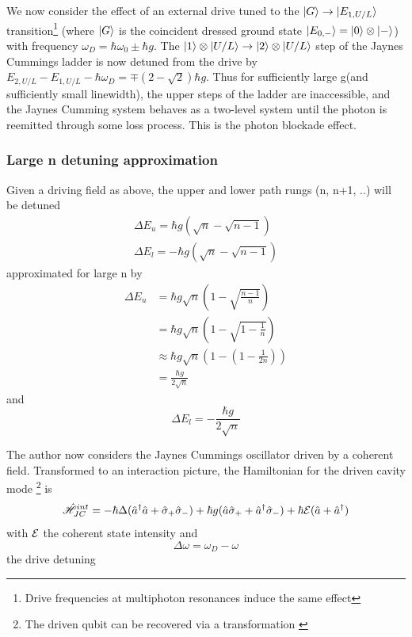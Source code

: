 We now consider the effect of an external drive tuned to the $| G \rangle \rightarrow | E_{1, U/L} \rangle$ transition\footnote{Drive frequencies at multiphoton resonances induce the same effect} (where $| G \rangle$ is the coincident dressed ground state $| E_{0, -} \rangle = | 0 \rangle \otimes | - \rangle$) with frequency $\omega_D = \hbar \omega_0 \pm \hbar g$.
The $| 1 \rangle \otimes | U/L \rangle \rightarrow | 2 \rangle \otimes | U/L \rangle$ step of the Jaynes Cummings ladder is now detuned from the drive by $E_{2, U/L} - E_{1, U/L} - \hbar \omega_D =  \mp(2-\sqrt{2}) \hbar g$. Thus for sufficiently large g(and sufficiently small linewidth), the upper steps of the ladder are inaccessible, and the Jaynes Cumming system behaves as a two-level system until the photon is reemitted through some loss process. This is the photon blockade effect.
\subsubsection{Large n detuning approximation}
Given a driving field as above, the upper and lower path rungs (n, n+1, ..) will be detuned 
\begin{align}
	\Delta E_u = \hbar g (\sqrt{n}-\sqrt{n-1}) \\
	\Delta E_l = -\hbar g (\sqrt{n}-\sqrt{n-1})
\end{align}
approximated for large n by
\begin{align}
	\Delta E_u &= \hbar g \sqrt{n} \left (1-\sqrt{\frac{n-1}{n}} \right ) \\
	&= \hbar g \sqrt{n} \left (1-\sqrt{1-\frac{1}{n}} \right ) \\
	& \approx \hbar g \sqrt{n} \left ( 1- \left ( 1 - \frac{1}{2n} \right ) \right ) \\ 
	&= \frac{\hbar g}{2 \sqrt{n}} 
\end{align}
and
\begin{equation}
	\Delta E_l = -\frac{\hbar g}{2 \sqrt{n}}
\end{equation}

The author now considers the Jaynes Cummings oscillator driven by a coherent field. Transformed to an interaction picture, the Hamiltonian for the driven cavity mode \footnote{The driven qubit can be recovered via a transformation \autocite{Alsing1999}} is 
\begin{equation}
	\hat{\mathscr{H}}_{JC}^{int} = -\hbar \Delta (\hat{a}^\dagger \hat{a} + \hat{\sigma}_+ \hat{\sigma}_-) + \hbar g(\hat{a} \hat{\sigma}_+ + \hat{a}^\dagger \hat{\sigma}_-) + \hbar \mathcal{E}(\hat{a} + \hat{a}^\dagger)
\end{equation}
with $\mathcal{E}$ the coherent state intensity and
\begin{equation}
	\Delta \omega = \omega_D - \omega
\end{equation}
the drive detuning

